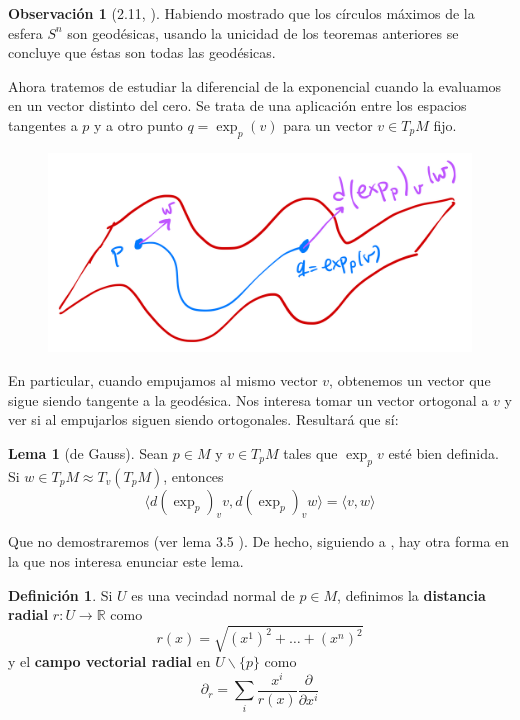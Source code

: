 \documentclass[spanish]{book}
\theoremstyle{definition}
\newtheorem*{defn}{Definición}
\newtheorem*{lema}{Lema}
\newtheorem*{obs}{Observación}
\newcommand{\R}{\mathbb{R}}
\begin{document}
	\begin{obs}[2.11, \cite{DoCarmo}]
		Habiendo mostrado que los círculos máximos de la esfera $S^n$ son geodésicas, usando la unicidad de los teoremas anteriores se concluye que éstas son todas las geodésicas.
	\end{obs}
	
	
	Ahora tratemos de estudiar la diferencial de la exponencial cuando la evaluamos en un vector distinto del cero. Se trata de una aplicación entre los espacios tangentes a $p$ y a otro punto $q=\exp_p(v)$ para un vector $v\in T_pM$ fijo.
	
	\begin{figure}[H]
		\centering
		\includegraphics[width=0.7\linewidth]{fig20}
	\end{figure}
	
	En particular, cuando empujamos al mismo vector $v$, obtenemos un vector que sigue siendo tangente a la geodésica. Nos interesa tomar un vector ortogonal a $v$ y ver si al empujarlos siguen siendo ortogonales. Resultará que sí:
	
	
	
	\begin{lema}[de Gauss]
		Sean $p\in M$ y $v\in T_pM$ tales que $\exp_pv$ esté bien definida. Si $w\in T_pM\approx T_v(T_pM)$, entonces
		\[\langle d(\exp_p)_vv,d(\exp_p)_vw\rangle=\langle v,w\rangle\]
	\end{lema}
	
	Que no demostraremos (ver lema 3.5 \cite{DoCarmo}). De hecho, siguiendo a \cite{Lee-riem}, hay otra forma en la que nos interesa enunciar este lema.
	
	\begin{defn}
		Si $U$ es una vecindad normal de $p\in M$, definimos la \textbf{distancia radial} \newline $r:U\to\R$ como
		\[r(x)=\sqrt{(x^1)^2+\ldots+(x^n)^2}\]
		y el \textbf{campo vectorial radial} en $U\backslash \{p\}$ como
		\[\partial_r=\sum_i\frac{x^i}{r(x)}\frac{\partial}{\partial x^i}\]
	\end{defn}
	
\end{document}
